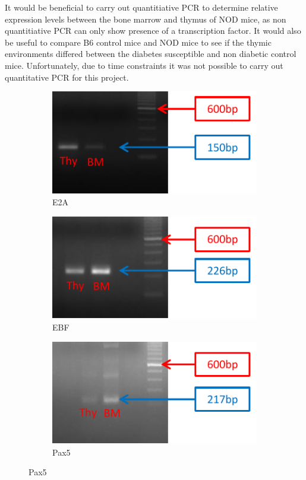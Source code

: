 It would be beneficial to carry out quantitiative PCR to determine relative expression levels between the bone marrow and thymus of NOD mice, as non quantitiative PCR can only show presence of a transcription factor.
It would also be useful to compare B6 control mice and NOD mice to see if the thymic environments differed between the diabetes susceptible and non diabetic control mice.
Unfortunately, due to time constraints it was not possible to carry out quantitative PCR for this project.

\begin{figure}
	\begin{subfigure}{0.5\textwidth}
	\centering
	\caption{E2A}
	\includegraphics[width=\textwidth]{Figures/E2A.pdf}
	\end{subfigure}
	\begin{subfigure}{0.5\textwidth}
	\centering
	\caption{EBF}
	\includegraphics[width=\textwidth]{Figures/EBF.pdf}
	\end{subfigure}
	\begin{subfigure}{0.5\textwidth}
	\centering
	\caption{Pax5}
	\includegraphics[width=\textwidth]{Figures/sPax5.pdf}

\end{subfigure}
\end{figure}
